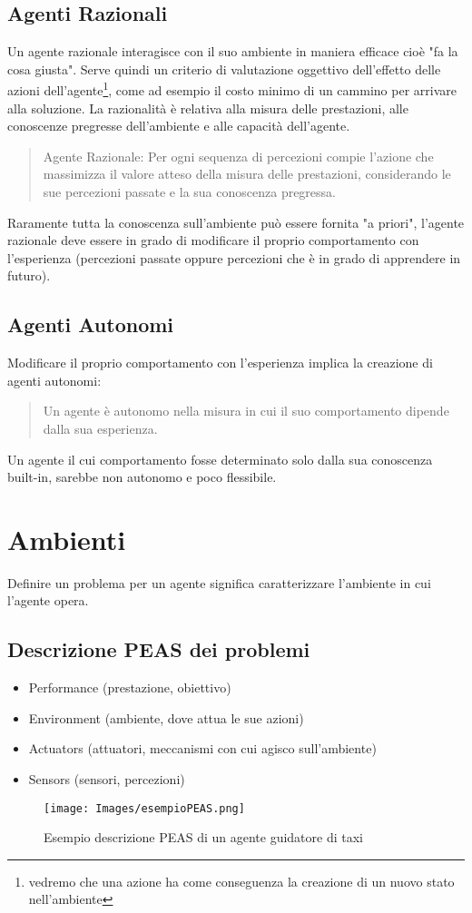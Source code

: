 \documentclass{article}
\begin{document}
\subsection{Agenti Razionali}
Un agente razionale interagisce con il suo ambiente in maniera efficace cioè "fa la cosa giusta". Serve quindi un criterio di valutazione oggettivo dell'effetto delle azioni dell'agente\footnote{vedremo che una azione ha come conseguenza la creazione di un nuovo stato nell'ambiente}, come ad esempio il costo minimo di un cammino per arrivare alla soluzione. La razionalità è relativa alla misura delle prestazioni, alle conoscenze pregresse dell'ambiente e alle capacità dell'agente.
\begin{quote}
    Agente Razionale: Per ogni sequenza di percezioni compie l'azione che massimizza il valore atteso della misura delle prestazioni, considerando le sue percezioni passate e la sua conoscenza pregressa.
\end{quote}
Raramente tutta la conoscenza sull'ambiente può essere fornita "a priori", l'agente razionale deve essere in grado di modificare il proprio comportamento con l'esperienza (percezioni passate oppure percezioni che è in grado di apprendere in futuro).

\subsection{Agenti Autonomi}
Modificare il proprio comportamento con l'esperienza implica la creazione di agenti autonomi:
\begin{quote}
    Un agente è autonomo nella misura in cui il suo comportamento dipende dalla sua esperienza. 
\end{quote}
Un agente il cui comportamento fosse determinato solo dalla sua conoscenza built-in, sarebbe non autonomo e poco flessibile.

\section{Ambienti}
Definire un problema per un agente significa caratterizzare l'ambiente in cui l'agente opera.

\subsection{Descrizione PEAS dei problemi}
\begin{itemize}
    \item Performance (prestazione, obiettivo)
    \item Environment (ambiente, dove attua le sue azioni)
    \item Actuators (attuatori, meccanismi con cui agisco sull'ambiente)
    \item Sensors (sensori, percezioni)
\end{itemize}
\begin{figure}[H]
    \centering
    \texttt{[image: Images/esempioPEAS.png]}
    \caption{Esempio descrizione PEAS di un agente guidatore di taxi}
\end{figure}
\clearpage
\end{document}
